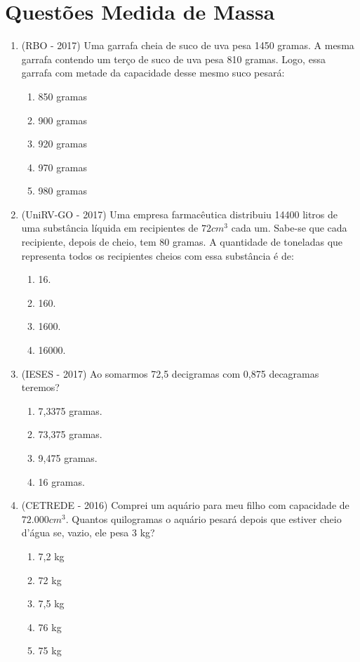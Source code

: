 \section{Questões Medida de Massa}
\begin{enumerate}
 \item (RBO - 2017) Uma garrafa cheia de suco de uva pesa 1450 gramas. A mesma garrafa contendo um terço de suco de uva pesa 810 gramas. Logo, essa garrafa com metade da capacidade desse mesmo suco pesará:
 \begin{enumerate}
 \item 850 gramas
 \item 900 gramas
 \item 920 gramas
 \item 970 gramas
 \item 980 gramas
\end{enumerate}


\item (UniRV-GO - 2017) Uma empresa farmacêutica distribuiu 14400 litros de uma substância líquida em recipientes de $72 cm^3$ cada um. Sabe-se que cada recipiente, depois de cheio, tem 80 gramas. A quantidade de toneladas que representa todos os recipientes cheios com essa substância é de:
\begin{enumerate}
 \item 16.
 \item 160.
 \item 1600.
 \item 16000.
\end{enumerate}

\item (IESES - 2017) Ao somarmos 72,5 decigramas com 0,875 decagramas teremos?
\begin{enumerate}
 \item 7,3375 gramas.
 \item 73,375 gramas.
 \item 9,475 gramas.
 \item 16 gramas.
\end{enumerate}

\item (CETREDE - 2016) Comprei um aquário para meu filho com capacidade de $72.000 cm^3$. Quantos quilogramas o aquário pesará depois que estiver cheio d’água se, vazio, ele pesa 3 kg?
\begin{enumerate}
 \item 7,2 kg
 \item 72 kg
 \item 7,5 kg
 \item 76 kg
 \item 75 kg
\end{enumerate}


\end{enumerate}

